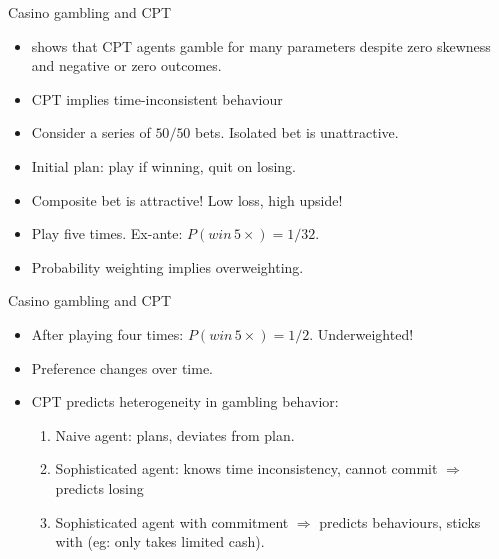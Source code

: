 \begin{frame}{Casino gambling and CPT}
    \begin{itemize}
        \item \citet{Barberis2012a} shows that CPT agents gamble for many parameters despite zero skewness and negative or zero outcomes.\medskip
        \item CPT implies time-inconsistent behaviour\medskip
        \item Consider a series of $50/50$ bets. Isolated bet is unattractive.\medskip
        \item Initial plan: play if winning, quit on losing.\medskip
        \item Composite bet is attractive! Low loss, high upside!\medskip
        \item Play five times. Ex-ante: $P(win\, 5 \times) = 1/32$.\medskip
        \item Probability weighting implies overweighting.\medskip
    \end{itemize}
\end{frame}

\begin{frame}{Casino gambling and CPT}
    \begin{itemize}
        \item After playing four times: $P(win\, 5 \times) = 1/2$. Underweighted!\bigskip
        \item Preference changes over time.\bigskip
        \item CPT predicts heterogeneity in gambling behavior:\bigskip
        \begin{enumerate}
            \item Naive agent: plans, deviates from plan.\medskip
            \item Sophisticated agent: knows time inconsistency, cannot commit
            $\Rightarrow$ predicts losing\medskip
            \item Sophisticated agent with commitment $\Rightarrow$ predicts behaviours, sticks with (eg: only takes limited cash).\medskip
        \end{enumerate}
    \end{itemize}
\end{frame}



